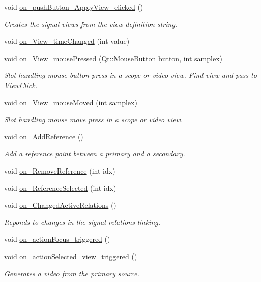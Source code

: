 \begin{CompactItemize}
void \hyperlink{class_main_window_aca5397b0d3a14c821570104806aeafc}{on\_\-pushButton\_\-ApplyView\_\-clicked} ()
\begin{CompactList}\small\item\em Creates the signal views from the view definition string. \item\end{CompactList}\item 
void \hyperlink{class_main_window_f14f116b194e257cc62ab202b046bf8a}{on\_\-View\_\-timeChanged} (int value)
\item 
void \hyperlink{class_main_window_f2a6e493949e61580eadf9ea2afb6fb0}{on\_\-View\_\-mousePressed} (Qt::MouseButton button, int samplex)
\begin{CompactList}\small\item\em Slot handling mouse button press in a scope or video view. Find view and pass to ViewClick. \item\end{CompactList}\item 
void \hyperlink{class_main_window_ecac34d763ecbc55584c31cff022f480}{on\_\-View\_\-mouseMoved} (int samplex)
\begin{CompactList}\small\item\em Slot handling mouse move press in a scope or video view. \item\end{CompactList}\item 
void \hyperlink{class_main_window_ea272096be6230d7d0e5d398004642ad}{on\_\-AddReference} ()
\begin{CompactList}\small\item\em Add a reference point between a primary and a secondary. \item\end{CompactList}\item 
void \hyperlink{class_main_window_81e2078a2e42c24daeda9d87ae6b97c5}{on\_\-RemoveReference} (int idx)
\item 
void \hyperlink{class_main_window_025bb12a52e1396bedb251e87d237fff}{on\_\-ReferenceSelected} (int idx)
\item 
void \hyperlink{class_main_window_038f3aa22e535c8e1255cedfe80fe9e4}{on\_\-ChangedActiveRelations} ()
\begin{CompactList}\small\item\em Reponds to changes in the signal relations linking. \item\end{CompactList}\item 
void \hyperlink{class_main_window_ae8f8aeaa4f1d25cde591a8d003f9bf7}{on\_\-actionFocus\_\-triggered} ()
\item 
void \hyperlink{class_main_window_f218905e5a3b5778ff51a2835a51088b}{on\_\-actionSelected\_\-view\_\-triggered} ()
\begin{CompactList}\small\item\em Generates a video from the primary source. \item\end{CompactList}\end{CompactItemize}
